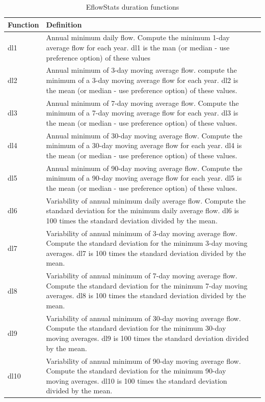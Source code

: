 \documentclass[a4paper,11pt]{article}\usepackage[]{graphicx}\usepackage[]{color}
\begin{document}
\begin{table}[ht]
  \centering
  \begin{threeparttable}[b]
  \caption{EflowStats duration functions}
  \label{tab:durStats}
\begin{tabularx}{\textwidth}{lXl}
  \hline
\textbf{Function} & \textbf{Definition} \\ 
  \hline
  dl1 & Annual minimum daily flow. Compute the minimum 1-day average flow for each year. dl1 is the man (or median - use preference option) of these values \\
  dl2 & Annual minimum of 3-day moving average flow. compute the minimum of a 3-day moving average flow for each year. dl2 is the mean (or median - use preference option) of these values. \\
  dl3 & Annual minimum of 7-day moving average flow. Compute the minimum of a 7-day moving average flow for each year. dl3 is the mean (or median - use preference option) of these values. \\
  dl4 & Annual minimum of 30-day moving average flow. Compute the minimum of a 30-day moving average flow for each year. dl4 is the mean (or median - use preference option) of these values. \\
  dl5 & Annual minimum of 90-day moving average flow. Compute the minimum of a 90-day moving average flow for each year. dl5 is the mean (or median - use preference option) of these values. \\
  dl6 & Variability of annual minimum daily average flow. Compute the standard deviation for the minimum daily average flow. dl6 is 100 times the standard deviation divided by the mean. \\
  dl7 & Variability of annual minimum of 3-day moving average flow. Compute the standard deviation for the minimum 3-day moving averages. dl7 is 100 times the standard deviation divided by the mean. \\
  dl8 & Variability of annual minimum of 7-day moving average flow. Compute the standard deviation for the minimum 7-day moving averages. dl8 is 100 times the standard deviation divided by the mean. \\
  dl9 & Variability of annual minimum of 30-day moving average flow. Compute the standard deviation for the minimum 30-day moving averages. dl9 is 100 times the standard deviation divided by the mean. \\
  dl10 & Variability of annual minimum of 90-day moving average flow. Compute the standard deviation for the minimum 90-day moving averages. dl10 is 100 times the standard deviation divided by the mean. \\

\end{tabularx}
\end{threeparttable}
\end{table}
\end{document}

